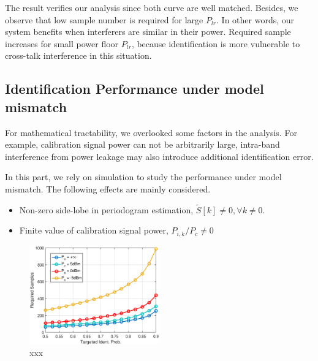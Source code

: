 \documentclass{IEEEtran}
\begin{document}
The result verifies our analysis since both curve are well matched. Besides, we observe that low sample number is required for large $P_{lr}$. In other words, our system benefits when interferers are similar in their power. Required sample increases for small power floor $P_{lr}$, because identification is more vulnerable to cross-talk interference in this situation.

%
%
\subsection{Identification Performance under model mismatch}
For mathematical tractability, we overlooked some factors in the analysis. For example, calibration signal power can not be arbitrarily large, intra-band interference from power leakage may also introduce additional identification error.

In this part, we rely on simulation to study the performance under model mismatch. The following effects are mainly considered.
\begin{itemize}
\item Non-zero side-lobe in periodogram estimation, $\tilde{S}[k] \neq 0, \forall k\neq 0$.
\item Finite value of calibration signal power, $P_{i,k}/P_c \neq 0$
\end{itemize}

\begin{figure}
\begin{center}
\includegraphics[width=0.5\textwidth]{figure/different_Pc_dependent_frames}
\end{center}
\caption{xxx}
\label{fig:sim_vs_theo4}
\end{figure}

%
%
\end{document}
